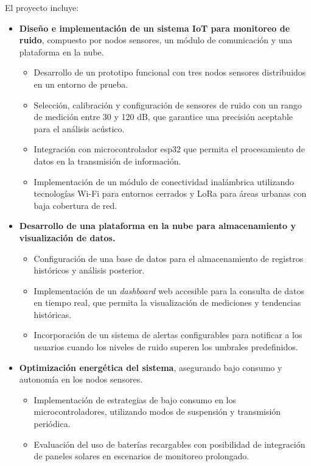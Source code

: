 \documentclass[
11pt, %
]{charter}
\begin{document}
\clearpage
El proyecto incluye:
\begin{itemize}
    \item \textbf{Diseño e implementación de un sistema IoT para monitoreo de ruido}, compuesto por nodos sensores, un módulo de comunicación y una plataforma en la nube.
    \begin{itemize}
        \item Desarrollo de un prototipo funcional con tres nodos sensores distribuidos en un entorno de prueba.
        \item Selección, calibración y configuración de sensores de ruido con un rango de medición entre 30 y 120 dB, 
        que garantice una precisión aceptable para el análisis acústico.
        \item Integración con microcontrolador esp32 que permita el procesamiento de datos en la transmisión de información.
        \item Implementación de un módulo de conectividad inalámbrica utilizando tecnologías Wi-Fi para entornos cerrados y LoRa para áreas urbanas con baja cobertura de red.
    \end{itemize}
    
    \item \textbf{Desarrollo de una plataforma en la nube para almacenamiento y visualización de datos.}
    \begin{itemize}
        \item Configuración de una base de datos para el almacenamiento de registros históricos y análisis posterior.
        \item Implementación de un \textit{dashboard} web accesible para la consulta de datos en tiempo real, que permita la visualización de mediciones y tendencias históricas.
        \item Incorporación de un sistema de alertas configurables para notificar a los usuarios cuando los niveles de ruido superen los umbrales predefinidos.
    \end{itemize}
    
    \item \textbf{Optimización energética del sistema}, asegurando bajo consumo y autonomía en los nodos sensores.
    \begin{itemize}
        \item Implementación de estrategias de bajo consumo en los microcontroladores, utilizando modos de suspensión y transmisión periódica.
        \item Evaluación del uso de baterías recargables con posibilidad de integración de paneles solares en escenarios de monitoreo prolongado.
    \end{itemize}
    
\end{itemize}
\end{document}
